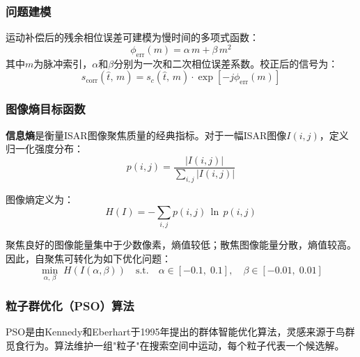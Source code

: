\documentclass[12pt, a4paper]{article}
\begin{document}
\subsubsection{问题建模}

运动补偿后的残余相位误差可建模为慢时间的多项式函数：
\begin{equation}
  \phi_{\mathrm{err}}(m) = \alpha\, m + \beta\, m^2
  \label{eq:phase_error}
\end{equation}
其中$m$为脉冲索引，$\alpha$和$\beta$分别为一次和二次相位误差系数。校正后的信号为：
\begin{equation}
  s_{\mathrm{corr}}(\hat{t},\, m) = s_c(\hat{t},\, m) \cdot \exp\!\left[-j\phi_{\mathrm{err}}(m)\right]
  \label{eq:phase_correction}
\end{equation}

\subsubsection{图像熵目标函数}

\textbf{信息熵}是衡量ISAR图像聚焦质量的经典指标\cite{ref_isar_autofocus}。对于一幅ISAR图像$I(i,j)$，定义归一化强度分布：
\begin{equation}
  p(i,j) = \frac{|I(i,j)|}{\displaystyle\sum_{i,j}|I(i,j)|}
  \label{eq:entropy_dist}
\end{equation}

图像熵定义为：
\begin{equation}
  H(I) = -\sum_{i,j} p(i,j)\,\ln\, p(i,j)
  \label{eq:entropy}
\end{equation}

聚焦良好的图像能量集中于少数像素，熵值较低；散焦图像能量分散，熵值较高。因此，自聚焦可转化为如下优化问题：
\begin{equation}
  \min_{\alpha,\,\beta}\; H\!\left(I(\alpha,\beta)\right)
  \quad\text{s.t.}\quad
  \alpha\in[-0.1,\;0.1],\quad
  \beta\in[-0.01,\;0.01]
  \label{eq:pso_objective}
\end{equation}

\subsubsection{粒子群优化（PSO）算法}

PSO是由Kennedy和Eberhart于1995年提出的群体智能优化算法\cite{ref_pso}，灵感来源于鸟群觅食行为。算法维护一组"粒子"在搜索空间中运动，每个粒子代表一个候选解。
\end{document}
